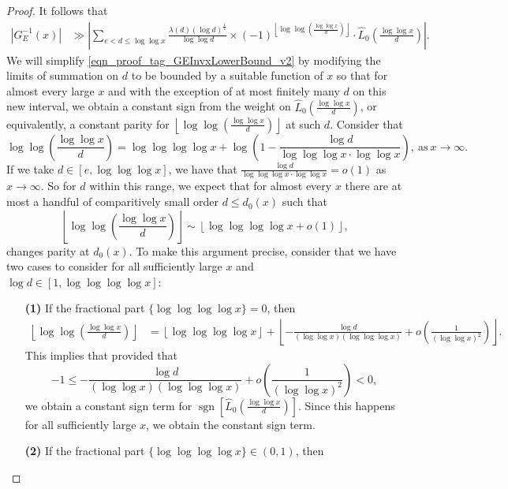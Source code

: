 \documentclass[11pt,reqno,a4letter]{article}
\numberwithin{figure}{section}
\numberwithin{table}{section}
\newcommand{\floor}[1]{\left\lfloor #1 \right\rfloor}
\theoremstyle{plain}
\numberwithin{theorem}{section}
\theoremstyle{definition}
\begin{document}
\begin{proof}
It follows that 
\begin{align} 
\label{eqn_proof_tag_GEInvxLowerBound_v2} 
|G_E^{-1}(x)| & \gg \left\lvert \sum_{e < d \leq \log\log x} 
     \frac{\lambda(d) (\log d)^{\frac{1}{4}}}{\log\log d} \times 
     (-1)^{\floor{\log\log\left(\frac{\log\log x}{d}\right)}} \cdot 
     \widehat{L}_0\left(\frac{\log\log x}{d}\right) \right\rvert. 
\end{align} 
We will simplify \eqref{eqn_proof_tag_GEInvxLowerBound_v2} 
by modifying the limits of summation on $d$ to be bounded by a 
suitable function of $x$ so that for almost every large $x$ and with the exception of at most 
finitely many $d$ on this new interval, we obtain a constant sign from the weight on 
$\widehat{L}_0\left(\frac{\log\log x}{d}\right)$, or equivalently, a constant parity for 
$\floor{\log\log\left(\frac{\log\log x}{d}\right)}$ at such $d$. 
Consider that 
\[
\log\log\left(\frac{\log\log x}{d}\right) = \log\log\log\log x + \log\left(1 - 
     \frac{\log d}{\log\log\log x \cdot \log\log x}\right), \mathrm{\ as\ } x \rightarrow \infty. 
\] 
If we take $d \in [e, \log\log\log x]$, we have that 
$\frac{\log d}{\log\log\log x \cdot \log\log x} = o(1)$ as $x \rightarrow \infty$. 
So for $d$ within this range, we expect that for almost every $x$ there are at most 
a handful of comparitively small order $d \leq d_0(x)$ such that 
\[
\floor{\log\log\left(\frac{\log\log x}{d}\right)} \sim \floor{\log\log\log\log x + o(1)}, 
\]
changes parity at $d_0(x)$. To make this argument precise, consider that we have two 
cases to consider for all sufficiently large $x$ and $\log d \in [1, \log\log\log\log x]$: 
\begin{itemize}[itemsep=0pt,topsep=0pt,leftmargin=0.25in]  
\item[\textbf{(1)}] If the fractional part $\{\log\log\log\log x\} = 0$, then 
     \begin{align*} 
     \floor{\log\log\left(\frac{\log\log x}{d}\right)} & = \floor{\log\log\log\log x} + 
          \floor{-\frac{\log d}{(\log\log x)(\log\log\log x)} + o\left(\frac{1}{(\log\log x)^2}\right)}. 
     \end{align*} 
     This implies that provided that 
     \[
     -1 \leq -\frac{\log d}{(\log\log x)(\log\log\log x)} + o\left(\frac{1}{(\log\log x)^2}\right) < 0, 
     \]
     we obtain a constant sign term for $\operatorname{sgn}\left[\widehat{L}_0\left(\frac{\log\log x}{d}\right)\right]$. 
     Since this happens for all sufficiently large $x$, we obtain the constant sign term. 
\item[\textbf{(2)}] If the fractional part $\{\log\log\log\log x\} \in (0, 1)$, then 

\end{itemize}
\end{proof}
\end{document}
